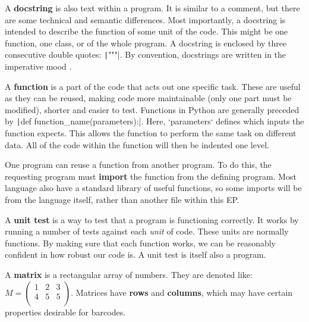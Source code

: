 \documentclass[a4paper,11pt]{article}
\begin{document}
    \begin{definition}
    A \textbf{docstring} is also text within a program. It is similar to a
    comment, but there are some technical and semantic differences. Most
    importantly, a docstring is intended to describe the function of some unit
    of the code. This might be one function, one class, or of the whole program.
    A docstring is enclosed by three consecutive double quotes:
    \texttt|"""|. By convention, docstrings are written in the
    imperative mood \cite{PEPDocstrings2014Goodger}.
    \end{definition}

    \begin{definition}
    A \textbf{function} is a part of the code that acts out one specific task.
    These are useful as they can be reused, making code more maintainable (only
    one part must be modified), shorter and easier to test. Functions in Python
    are generally preceded by \texttt|def
    function_name(parameters):|.  Here, `parameters` defines which inputs the
    function expects. This allows the function to perform the same task on
    different data. All of the code within the function will then be indented
    one level.
    \end{definition}

    \begin{definition}
    One program can reuse a function from another program. To do this, the
    requesting program must \textbf{import} the function from the defining
    program. Most language also have a standard library of useful functions, so
    some imports will be from the language itself, rather than another file
    within this EP.
    \end{definition}

    \begin{definition}
    A \textbf{unit test} is a way to test that a program is functioning
    correctly. It works by running a number of tests against each \textit{unit}
    of code. These units are normally functions. By making sure that each
    function works, we can be reasonably confident in how robust our code is. A
    unit test is itself also a program.
    \end{definition}

    \begin{definition}
    A \textbf{matrix} is a rectangular array of numbers. They are denoted like:
    \begin{math}
    M =
    \begin{pmatrix}
    1 & 2 & 3 \\
    4 & 5 & 5 \\
    \end{pmatrix}
    \end{math}.
    Matrices have \textbf{rows} and \textbf{columns}, which may have certain
    properties desirable for barcodes.
    \end{definition}
\end{document}
